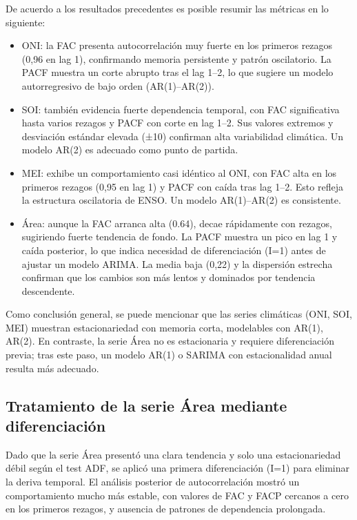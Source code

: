 De acuerdo a los resultados precedentes es posible resumir las métricas en lo siguiente:
\begin{itemize}
    \item ONI: la FAC presenta autocorrelación muy fuerte en los primeros rezagos 
    (0,96 en lag 1), confirmando memoria persistente y patrón oscilatorio. La PACF muestra 
    un corte abrupto tras el lag 1–2, lo que sugiere un modelo autorregresivo de bajo orden 
    (AR(1)–AR(2)).
    
    \item SOI: también evidencia fuerte dependencia temporal, con FAC significativa 
    hasta varios rezagos y PACF con corte en lag 1–2. Sus valores extremos y desviación 
    estándar elevada (±10) confirman alta variabilidad climática. Un modelo AR(2) es adecuado 
    como punto de partida.
    
    \item MEI: exhibe un comportamiento casi idéntico al ONI, con FAC alta en los 
    primeros rezagos (0,95 en lag 1) y PACF con caída tras lag 1–2. Esto refleja la estructura 
    oscilatoria de ENSO. Un modelo AR(1)–AR(2) es consistente.
    
    \item Área: aunque la FAC arranca alta (0.64), decae rápidamente con rezagos, 
    sugiriendo fuerte tendencia de fondo. La PACF muestra un pico en lag 1 y caída posterior, 
    lo que indica necesidad de diferenciación (I=1) antes de ajustar un modelo ARIMA. La media 
    baja (0,22) y la dispersión estrecha confirman que los cambios son más lentos y dominados 
    por tendencia descendente.
\end{itemize}




Como conclusión general, se puede mencionar que las series climáticas (ONI, SOI, MEI) muestran 
estacionariedad con memoria corta, modelables con AR(1), AR(2). En contraste, la serie 
Área no es estacionaria y requiere diferenciación previa; tras este paso, un modelo AR(1) 
o SARIMA con estacionalidad anual resulta más adecuado.

\subsection{Tratamiento de la serie Área mediante diferenciación}

Dado que la serie Área presentó una clara tendencia y solo una estacionariedad débil según 
el test ADF, se aplicó una primera diferenciación (I=1) para eliminar la deriva temporal. 
El análisis posterior de autocorrelación mostró un comportamiento mucho más estable, con 
valores de FAC y FACP cercanos a cero en los primeros rezagos, y ausencia de patrones de 
dependencia prolongada.

